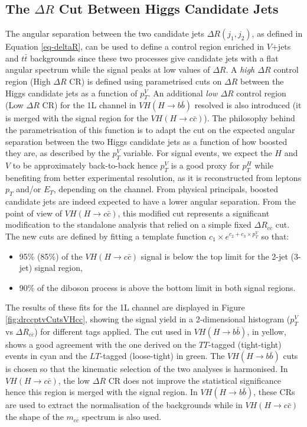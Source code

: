 \subsection{The $\Delta R$ Cut Between Higgs Candidate Jets}\label{ap-sec-vh-deltaR}
The angular separation between the two candidate jets $\Delta R(j_1, j_2)$, as defined in Equation \ref{eq-deltaR}, can be used to define a control region enriched in $V$+jets and $t\bar{t}$ backgrounds since these two processes give candidate jets with a flat angular spectrum while the signal peaks at low values of $\Delta R$. A \textit{high $\Delta R$} control region (High $\Delta R$ CR) is defined using parametrised cuts on $\Delta R$ between the Higgs candidate jets as a function of $p_T^V$. An additional \textit{low $\Delta R$} control region (Low $\Delta R$ CR) for the 1L channel in $VH (H\rightarrow b\bar{b})$ resolved is also introduced (it is merged with the signal region for the $VH (H\rightarrow c\bar{c})$). The philosophy behind the parametrisation of this function is to adapt the cut on the expected angular separation between the two Higgs candidate jets as a function of how boosted they are, as described by the $p_T^V$ variable. For signal events, we expect the $H$ and $V$ to be approximately back-to-back hence $p_T^V$ is a good proxy for $p_T^H$ while benefiting from better experimental resolution, as it is reconstructed from leptons $p_T$ and/or $E_T$, depending on the channel. From physical principals, boosted candidate jets are indeed expected to have a lower angular separation. From the point of view of $VH (H\rightarrow c\bar{c})$, this modified cut represents a significant modification to the standalone analysis that relied on a simple fixed $\Delta R_{c\bar{c}}$ cut. The new cuts are defined by fitting a template function $ c_1 \times e^{c_2 + c_3 \times p_T^V}$ so that:   
\begin{itemize}
\item 95\% (85\%) of the $VH(H\rightarrow c\bar{c})$ signal is below the top limit for the 2-jet (3-jet) signal region,
\item 90\% of the diboson process is above the bottom limit in both signal regions.
\end{itemize}

The results of these fits for the 1L channel are displayed in Figure \ref{fig:drccptvCutsVHcc}, showing the signal yield in a 2-dimensional histogram ($p_T^V$ vs $\Delta R_{c\bar{c}}$) for different tags applied. The cut used in $VH(H\rightarrow b\bar{b})$, in yellow, shows a good agreement with the one derived on the $TT$-tagged (tight-tight) events in cyan and the $LT$-tagged (loose-tight) in green. The $VH(H\rightarrow b\bar{b})$ cuts is chosen so that the kinematic selection of the two analyses is harmonised. In $VH (H\rightarrow c\bar{c})$, the low $\Delta R$ CR does not improve the statistical significance hence this region is merged with the signal region. In $VH(H\rightarrow b\bar{b})$, these CRs are used to extract the normalisation of the backgrounds while in $VH (H\rightarrow c\bar{c})$ the shape of the $m_{c\bar{c}}$ spectrum is also used.  \\

